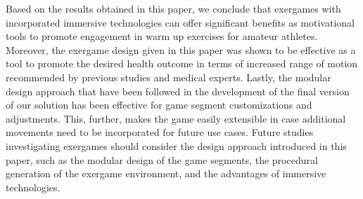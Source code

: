 Based on the results obtained in this paper, we conclude that exergames with incorporated immersive technologies can offer significant benefits as motivational tools to promote engagement in warm up exercises for amateur athletes. Moreover, the  exergame design given in this paper was shown to be effective as a tool to promote the desired health outcome in terms of increased range of motion recommended by previous studies and medical experts.  Lastly, the modular design approach that have been followed in the development of the final version of our solution has been effective for game segment customizations and adjustments. This, further, makes the game easily extensible in case additional movements need to be incorporated for future use cases. Future studies investigating exergames should consider the design approach introduced in this paper, such as the modular design of the game segments, the  procedural generation of the exergame environment, and the advantages of immersive technologies.
